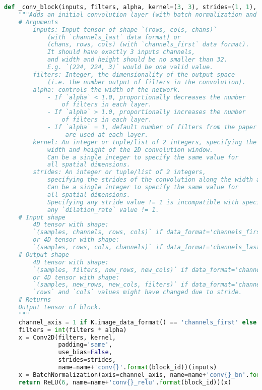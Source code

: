 \begin{lstlisting}[language=Python]
def _conv_block(inputs, filters, alpha, kernel=(3, 3), strides=(1, 1), block_id=1, name=''):
    """Adds an initial convolution layer (with batch normalization and relu6).
    # Arguments
        inputs: Input tensor of shape `(rows, cols, chans)`
            (with `channels_last` data format) or
            (chans, rows, cols) (with `channels_first` data format).
            It should have exactly 3 inputs channels,
            and width and height should be no smaller than 32.
            E.g. `(224, 224, 3)` would be one valid value.
        filters: Integer, the dimensionality of the output space
            (i.e. the number output of filters in the convolution).
        alpha: controls the width of the network.
            - If `alpha` < 1.0, proportionally decreases the number
                of filters in each layer.
            - If `alpha` > 1.0, proportionally increases the number
                of filters in each layer.
            - If `alpha` = 1, default number of filters from the paper
                 are used at each layer.
        kernel: An integer or tuple/list of 2 integers, specifying the
            width and height of the 2D convolution window.
            Can be a single integer to specify the same value for
            all spatial dimensions.
        strides: An integer or tuple/list of 2 integers,
            specifying the strides of the convolution along the width and height.
            Can be a single integer to specify the same value for
            all spatial dimensions.
            Specifying any stride value != 1 is incompatible with specifying
            any `dilation_rate` value != 1.
    # Input shape
        4D tensor with shape:
        `(samples, channels, rows, cols)` if data_format='channels_first'
        or 4D tensor with shape:
        `(samples, rows, cols, channels)` if data_format='channels_last'.
    # Output shape
        4D tensor with shape:
        `(samples, filters, new_rows, new_cols)` if data_format='channels_first'
        or 4D tensor with shape:
        `(samples, new_rows, new_cols, filters)` if data_format='channels_last'.
        `rows` and `cols` values might have changed due to stride.
    # Returns
	Output tensor of block.
    """
    channel_axis = 1 if K.image_data_format() == 'channels_first' else -1
    filters = int(filters * alpha)
    x = Conv2D(filters, kernel,
               padding='same',
               use_bias=False,
               strides=strides,
               name=name+'conv{}'.format(block_id))(inputs)
    x = BatchNormalization(axis=channel_axis, name=name+'conv{}_bn'.format(block_id))(x)
    return ReLU(6, name=name+'conv{}_relu'.format(block_id))(x)


\end{lstlisting}
